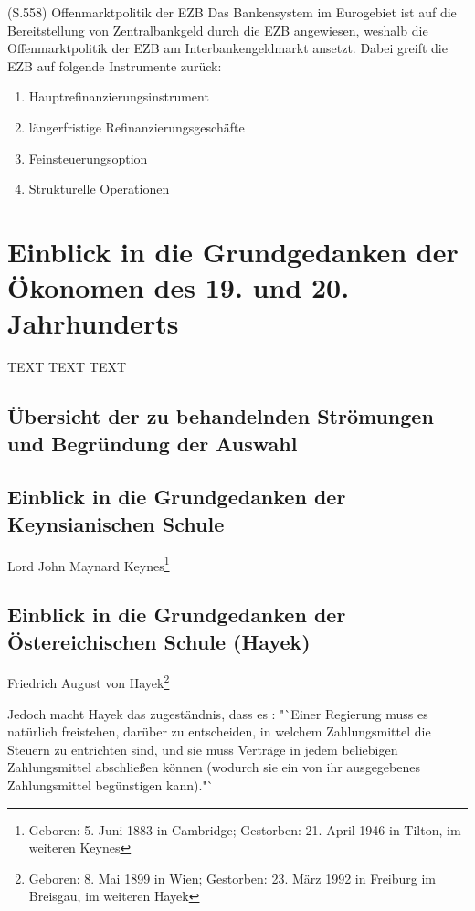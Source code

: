 \documentclass[
        onecolumn,
        a4paper,
        abstracton,
        parskip=half
        ,final
        ]{scrartcl}
\begin{document}
(S.558)
Offenmarktpolitik der EZB
Das Bankensystem im Eurogebiet ist auf die Bereitstellung von Zentralbankgeld durch die EZB angewiesen, weshalb die Offenmarktpolitik der EZB am Interbankengeldmarkt ansetzt. Dabei greift die EZB auf folgende Instrumente zur{\"u}ck:
\begin{enumerate}
  \item{Hauptrefinanzierungsinstrument}
  \item{l{\"a}ngerfristige Refinanzierungsgesch{\"a}fte}
  \item{Feinsteuerungsoption}
  \item{Strukturelle Operationen}
  \end{enumerate}


\clearpage

\section{Einblick in die Grundgedanken der {\"O}konomen des 19. und 20. Jahrhunderts}
  \label{sec3:stroemungen}
  TEXT TEXT TEXT


\subsection{{\"U}bersicht der zu behandelnden Str{\"o}mungen und Begr{\"u}ndung der Auswahl}

\subsection{Einblick in die Grundgedanken der Keynsianischen Schule}

Lord John Maynard Keynes\footnote[14]{Geboren:  5. Juni 1883 in Cambridge; Gestorben: 21. April 1946 in Tilton, im weiteren Keynes}


\subsection{Einblick in die Grundgedanken der {\"O}stereichischen Schule (Hayek)}


Friedrich August von Hayek\footnote[15]{Geboren: 8. Mai 1899 in Wien; Gestorben: 23. M{\"a}rz 1992 in Freiburg im Breisgau, im weiteren Hayek}

Jedoch macht Hayek das zugest{\"a}ndnis, dass es \citep[vgl.][S.23]{Hayek1977}: "`Einer Regierung muss es nat{\"u}rlich freistehen, dar{\"u}ber zu entscheiden, in welchem Zahlungsmittel die Steuern zu entrichten sind, und sie muss Vertr{\"a}ge in jedem beliebigen Zahlungsmittel abschlie{\ss}en k{\"o}nnen (wodurch sie ein von ihr ausgegebenes Zahlungsmittel beg{\"u}nstigen kann)."`
\end{document}
